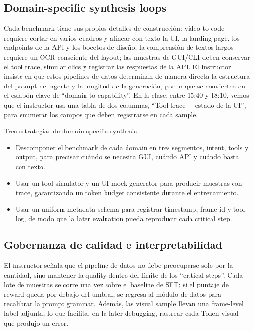 \subsection{Domain-specific synthesis loops}
Cada benchmark tiene sus propios detalles de construcción: video-to-code requiere cortar en varios cuadros y alinear con texto la UI, la landing page, los endpoints de la API y los bocetos de diseño; la comprensión de textos largos requiere un OCR consciente del layout; las muestras de GUI/CLI deben conservar el tool trace, simular clics y registrar las respuestas de la API. El instructor insiste en que estos pipelines de datos determinan de manera directa la estructura del prompt del agente y la longitud de la generación, por lo que se convierten en el eslabón clave de ``domain-to-capability''. En la clase, entre 15:40 y 18:10, vemos que el instructor usa una tabla de dos columnas, ``Tool trace + estado de la UI'', para enumerar los campos que deben registrarse en cada sample.

\begin{knowledgebox}{Tres estrategias de domain-specific synthesis}
\begin{itemize}
    \item Descomponer el benchmark de cada domain en tres segmentos, intent, tools y output, para precisar cuándo se necesita GUI, cuándo API y cuándo basta con texto.
    \item Usar un tool simulator y un UI mock generator para producir muestras con trace, garantizando un token budget consistente durante el entrenamiento.
    \item Usar un uniform metadata schema para registrar timestamp, frame id y tool log, de modo que la later evaluation pueda reproducir cada critical step.
\end{itemize}
\end{knowledgebox}

\subsection{Gobernanza de calidad e interpretabilidad}
El instructor señala que el pipeline de datos no debe preocuparse solo por la cantidad, sino mantener la quality dentro del límite de los ``critical steps''. Cada lote de muestras se corre una vez sobre el baseline de SFT; si el puntaje de reward queda por debajo del umbral, se regresa al módulo de datos para recalibrar la prompt grammar. Además, las visual sample llevan una frame-level label adjunta, lo que facilita, en la later debugging, rastrear cada Token visual que produjo un error.

